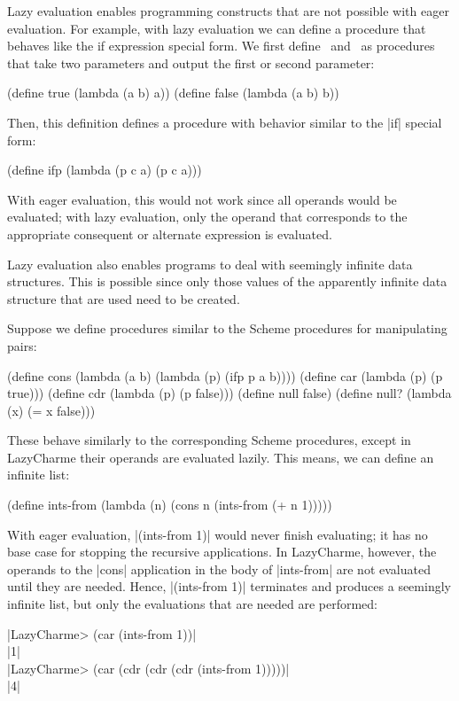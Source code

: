 \begin{schemeregion}

Lazy evaluation enables programming constructs that are not possible with eager evaluation.  For example, with lazy evaluation we can define a procedure that behaves like the if expression special form.  
We first define \true\ and \false\ as procedures that take two parameters and output the first or second parameter:
\begin{schemedisplay}
(define true (lambda (a b) a))
(define false (lambda (a b) b))
\end{schemedisplay}
Then, this definition defines a procedure with behavior similar to the \scheme|if| special form:
\begin{schemedisplay}
(define ifp (lambda (p c a) (p c a)))
\end{schemedisplay}
With eager evaluation, this would not work since all operands would be evaluated; with lazy evaluation, only the operand that corresponds to the appropriate consequent or alternate expression is evaluated.

Lazy evaluation also enables programs to deal with seemingly infinite data structures.  This is possible since only those values of the apparently infinite data structure that are used need to be created.


Suppose we define procedures similar to the Scheme procedures for manipulating pairs:
\begin{schemedisplay}
(define cons (lambda (a b) (lambda (p) (ifp p a b))))
(define car (lambda (p) (p true)))
(define cdr (lambda (p) (p false)))
(define null false)
(define null? (lambda (x) (= x false)))
\end{schemedisplay}

These behave similarly to the corresponding Scheme procedures, except in LazyCharme their operands are evaluated lazily.  This means, we can define an infinite list:
\begin{schemedisplay}
(define ints-from (lambda (n) (cons n (ints-from (+ n 1)))))
\end{schemedisplay}
With eager evaluation, \scheme|(ints-from 1)| would never finish evaluating; it has no base case for stopping the recursive applications.  In LazyCharme, however, the operands to the \scheme|cons| application in the body of \scheme|ints-from| are not evaluated until they are needed.  Hence, \scheme|(ints-from 1)| terminates and produces a seemingly infinite list, but only the evaluations that are needed are performed:
\begin{code}
\scheme|LazyCharme> (car (ints-from 1))|\\
\schemeresult|1|\\
\scheme|LazyCharme> (car (cdr (cdr (cdr (ints-from 1)))))|\\
\schemeresult|4|\\
\end{code}


\end{schemeregion}
